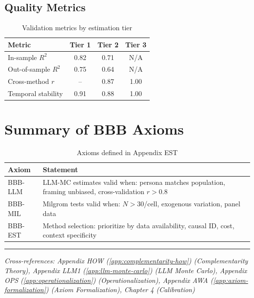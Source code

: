 \documentclass[11pt,a4paper]{article}
\theoremstyle{definition}
\begin{document}
\subsection{Quality Metrics}

\begin{table}[h]
\centering
\begin{tabular}{lccc}
\toprule
\textbf{Metric} & \textbf{Tier 1} & \textbf{Tier 2} & \textbf{Tier 3} \\
\midrule
In-sample $R^2$ & 0.82 & 0.71 & N/A \\
Out-of-sample $R^2$ & 0.75 & 0.64 & N/A \\
Cross-method $r$ & -- & 0.87 & 1.00 \\
Temporal stability & 0.91 & 0.88 & 1.00 \\
\bottomrule
\end{tabular}
\caption{Validation metrics by estimation tier}
\label{tab:validation}
\end{table}


\section{Summary of BBB Axioms}
\label{sec:bbb-axioms}

\begin{table}[h]
\centering
\begin{tabular}{lp{10cm}}
\toprule
\textbf{Axiom} & \textbf{Statement} \\
\midrule
BBB-LLM & LLM-MC estimates valid when: persona matches population, framing unbiased, cross-validation $r > 0.8$ \\
BBB-MIL & Milgrom tests valid when: $N > 30$/cell, exogenous variation, panel data \\
BBB-EST & Method selection: prioritize by data availability, causal ID, cost, context specificity \\
\bottomrule
\end{tabular}
\caption{Axioms defined in Appendix EST}
\label{tab:bbb-axioms}
\end{table}

\vspace{1em}
\hrule
\vspace{0.5em}
\noindent\textit{Cross-references: Appendix HOW (\ref{app:complementarity-how}) (Complementarity Theory), 
Appendix LLM1 (\ref{app:llm-monte-carlo}) (LLM Monte Carlo), Appendix OPS (\ref{app:operationalization}) (Operationalization), 
Appendix AWA (\ref{app:axiom-formalization}) (Axiom Formalization), Chapter 4 (Calibration)}
\end{document}
